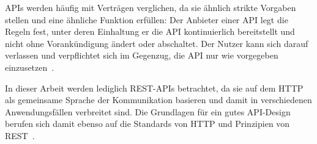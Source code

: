 \acp{API} werden häufig mit Verträgen verglichen, da sie ähnlich strikte Vorgaben stellen und eine ähnliche Funktion erfüllen:
Der Anbieter einer \ac{API} legt die Regeln fest, unter deren Einhaltung er die \ac{API} kontinuierlich bereitstellt und nicht ohne Vorankündigung ändert oder abschaltet.
Der Nutzer kann sich darauf verlassen und verpflichtet sich im Gegenzug, die \ac{API} nur wie vorgegeben einzusetzen~\cites[1627]{cha21}{ope23a}.

In dieser Arbeit werden lediglich \acs{REST}-\acp{API} betrachtet, da sie auf dem \acf{HTTP} als gemeinsame Sprache der Kommunikation basieren und damit in verschiedenen Anwendungsfällen verbreitet sind.
Die Grundlagen für ein gutes \ac{API}-Design berufen sich damit ebenso auf die Standards von \ac{HTTP} und Prinzipien von \ac{REST}~\cite[1628]{cha21}.